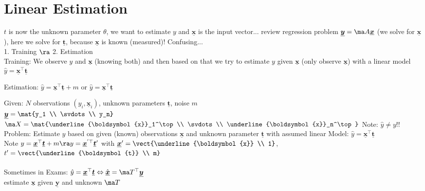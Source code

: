 \documentclass[english]{latex4ei/latex4ei_sheet}
\renewcommand{\vec}[1]{\underline{\boldsymbol{#1}}}
\begin{document}
\section{Linear Estimation}
\begin{emphbox}
	$t$ is now the unknown parameter $θ$, we want to estimate $y$ and $\vec x$ is the input vector...  review regression problem $\vec y = \ma A \vec x$ (we solve for $\vec x$), here we solve for $\vec t$, because $\vec x$ is known (measured)! Confusing...\\
	1. Training $\ra$ 2. Estimation\\
	Training: We observe $y$ and $\vec x$ (knowing both) and then based on that we try to estimate $y$ given $\vec x$ (only observe $\vec x$) with a linear model $\hat y=\vec x^\top\vec t$
\end{emphbox}

\begin{sectionbox}
	\begin{emphbox}
		Estimation: $\hat y = \vec x^\top \vec t + m$ \quad or \quad $\hat y = \vec x^\top \vec t$\\
	\end{emphbox}
	Given: $N$ observations $(y_i, \vec x_i)$, unknown parameters $\vec t$, noise $m$\\
	$\vec y = \mat{y_1 \\ \svdots \\ y_n}$ \quad $\ma X = \mat{\vec{x}_1^\top \\ \svdots \\ \vec{x}_n^\top}$ \qquad Note: $\hat y ≠ y$!!\\
	Problem: Estimate $y$ based on given (known) observations $\vec x$ and unknown parameter $\vec t$ with assumed linear Model: $\hat y = \vec x^\top \vec t$\\
	Note $y = \vec x^\top \vec t + m \ra y = \vec x^{'\top} \vec t'$ with $\vec x'=\vect{\vec x \\ 1}$,\quad$t'=\vect{\vec t \\ m}$\\
	\\
	Sometimes in Exams: $\hat y = \vec x^\top \vec t \Leftrightarrow \hat{\vec x} = \ma T^\top \vec y$\\ estimate $\vec x$ given $\vec y$ and unknown $\ma T$\\
\end{sectionbox}
\end{document}
